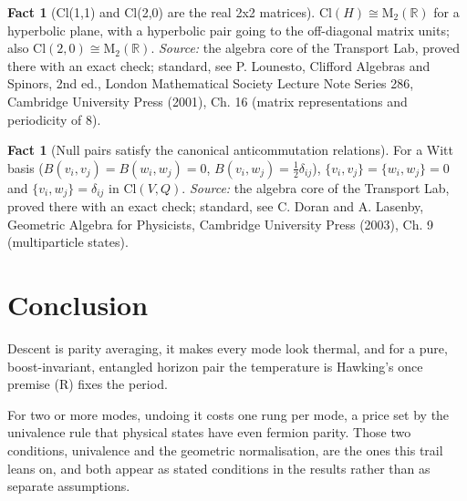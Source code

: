 \documentclass[11pt]{article}
\theoremstyle{definition}
\newtheorem{fact}[theorem]{Fact}
\theoremstyle{plain}
\providecommand{\Cl}{}\renewcommand{\Cl}{\mathrm{Cl}}
\providecommand{\Mat}{}\renewcommand{\Mat}{\mathrm{M}}
\providecommand{\R}{}\renewcommand{\R}{\mathbb{R}}
\begin{document}
\begin{fact}[Cl(1,1) and Cl(2,0) are the real 2x2 matrices]\label{c:std-algebra.cl11-matrix}
$\Cl(H) \cong \Mat_2(\R)$ for a hyperbolic plane, with a hyperbolic pair going to the off-diagonal matrix units; also $\Cl(2,0) \cong \Mat_2(\R)$.
\emph{Source:} the algebra core of the Transport Lab, proved there with an exact check; standard, see P. Lounesto, Clifford Algebras and Spinors, 2nd ed., London Mathematical Society Lecture Note Series 286, Cambridge University Press (2001), Ch. 16 (matrix representations and periodicity of 8).
\end{fact}

\begin{fact}[Null pairs satisfy the canonical anticommutation relations]\label{c:std-algebra.witt-basis-car}
For a Witt basis ($B(v_i,v_j) = B(w_i,w_j) = 0$, $B(v_i,w_j) = \tfrac12\delta_{ij}$), $\{v_i,v_j\} = \{w_i,w_j\} = 0$ and $\{v_i,w_j\} = \delta_{ij}$ in $\Cl(V,Q)$.
\emph{Source:} the algebra core of the Transport Lab, proved there with an exact check; standard, see C. Doran and A. Lasenby, Geometric Algebra for Physicists, Cambridge University Press (2003), Ch. 9 (multiparticle states).
\end{fact}

\section*{Conclusion}
Descent is parity averaging, it makes every mode look thermal, and for a pure, boost-invariant, entangled horizon pair the temperature is Hawking's once premise (R) fixes the period.

For two or more modes, undoing it costs one rung per mode, a price set by the univalence rule that physical states have even fermion parity. Those two conditions, univalence and the geometric normalisation, are the ones this trail leans on, and both appear as stated conditions in the results rather than as separate assumptions.
\end{document}
